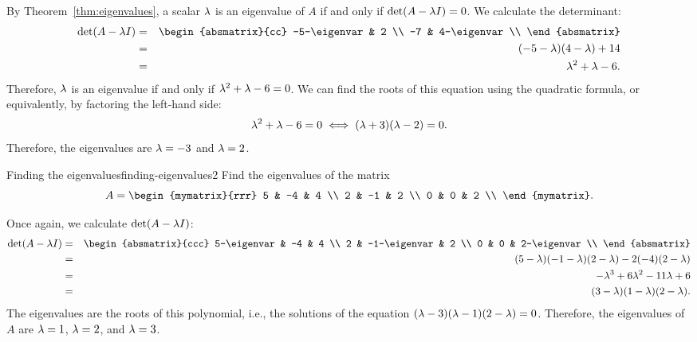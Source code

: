 \begin{solution}
  By Theorem~\ref{thm:eigenvalues}, a scalar $\lambda$ is an
  eigenvalue of $A$ if and only if $\det(A-\lambda I)=0$. We calculate
  the determinant:
  \begin{eqnarray*}
    \det(A-\eigenvar I)
    &=&
    \begin{absmatrix}{cc}
      -5-\eigenvar & 2 \\
      -7 & 4-\eigenvar \\
    \end{absmatrix} \\
    &=& (-5-\eigenvar)(4-\eigenvar) + 14 \\
    &=& \eigenvar^2 + \eigenvar - 6.
  \end{eqnarray*}
  Therefore, $\lambda$ is an eigenvalue if and only if
  $\lambda^2 + \lambda - 6 = 0$. We can find the roots of this
  equation using the quadratic formula, or equivalently, by factoring
  the left-hand side:
  \begin{equation*}
    \lambda^2 + \lambda - 6 = 0
    \iff
    (\lambda+3)(\lambda-2) = 0.
  \end{equation*}
  Therefore, the eigenvalues are $\lambda=-3$ and $\lambda=2$.
\end{solution}

\begin{example}{Finding the eigenvalues}{finding-eigenvalues2}
  Find the eigenvalues of the matrix
  \begin{equation*}
    A=\begin{mymatrix}{rrr}
      5 & -4 & 4 \\
      2 & -1 & 2 \\
      0 &  0 & 2 \\
    \end{mymatrix}.
  \end{equation*}
\end{example}

\begin{solution}
  Once again, we calculate $\det(A-\lambda I)$:
  \begin{eqnarray*}
    \det(A-\eigenvar I)
    &=&
        \begin{absmatrix}{ccc}
          5-\eigenvar & -4 & 4 \\
          2 & -1-\eigenvar & 2 \\
          0 &  0 & 2-\eigenvar \\
        \end{absmatrix} \\
    &=&
        (5-\eigenvar)(-1-\eigenvar)(2-\eigenvar) - 2(-4)(2-\eigenvar) \\
    &=& -\eigenvar^3 + 6\eigenvar^2 - 11\eigenvar + 6 \\
    &=& (3-\eigenvar)(1-\eigenvar)(2-\eigenvar).
  \end{eqnarray*}
  The eigenvalues are the roots of this polynomial, i.e., the
  solutions of the equation
  $(\lambda-3)(\lambda-1)(2-\lambda)=0$. Therefore, the eigenvalues of
  $A$ are $\lambda=1$, $\lambda=2$, and $\lambda=3$.
\end{solution}

